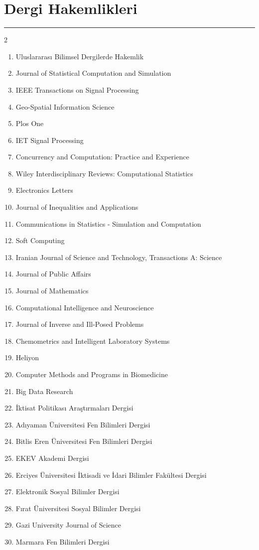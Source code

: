 \documentclass[10pt,a4paper]{article}
\newcommand{\NewPart}[2]{%
	\Needspace{7\baselineskip}%
	\vspace{0.45em}%
	\section*{\sffamily\large\bfseries\color{MidnightBlue}#1 #2}%
	\vspace{-0.7em}\noindent\color{MidnightBlue}\rule{\textwidth}{0.55pt}\color{Black}\vspace{0.25em}}
\begin{document}
\NewPart{Dergi Hakemlikleri}{}
\begin{multicols}{2}
\begin{enumerate}
\item Uluslararası Bilimsel Dergilerde Hakemlik
\item Journal of Statistical Computation and Simulation 
\item IEEE Transactions on Signal Processing 
\item Geo-Spatial Information Science 
\item Plos One 
\item IET Signal Processing 
\item Concurrency and Computation: Practice and Experience 
\item Wiley Interdisciplinary Reviews: Computational Statistics 
\item Electronics Letters 
\item Journal of Inequalities and Applications 
\item Communications in Statistics - Simulation and Computation 
\item Soft Computing 
\item Iranian Journal of Science and Technology, Transactions A: Science 
\item Journal of Public Affairs 
\item Journal of Mathematics
\item Computational Intelligence and Neuroscience
\item Journal of Inverse and Ill-Posed Problems 
\item Chemometrics and Intelligent Laboratory Systems
\item Heliyon
\item Computer Methods and Programs in Biomedicine
\item Big Data Research
\item İktisat Politikası Araştırmaları Dergisi
\item Adıyaman Üniversitesi Fen Bilimleri Dergisi
\item Bitlis Eren Üniversitesi Fen Bilimleri Dergisi
\item EKEV Akademi Dergisi
\item Erciyes Üniversitesi İktisadi ve İdari Bilimler Fakültesi Dergisi
\item Elektronik Sosyal Bilimler Dergisi
\item Fırat Üniversitesi Sosyal Bilimler Dergisi
\item Gazi University Journal of Science
\item Marmara Fen Bilimleri Dergisi

\end{enumerate}
\end{multicols}
\end{document}
